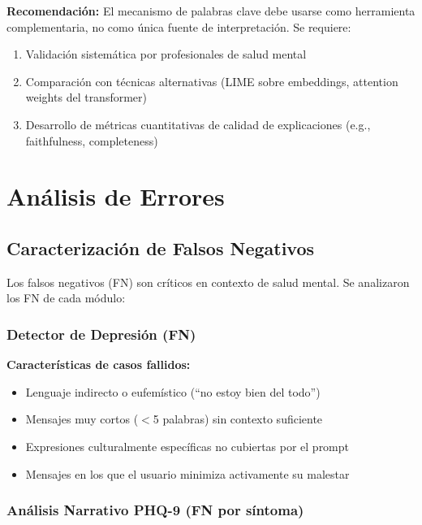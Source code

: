 \textbf{Recomendación:}
El mecanismo de palabras clave debe usarse como herramienta complementaria, no como
única fuente de interpretación. Se requiere:
\begin{enumerate}
    \item Validación sistemática por profesionales de salud mental
    \item Comparación con técnicas alternativas (LIME sobre embeddings, attention weights
          del transformer)
    \item Desarrollo de métricas cuantitativas de calidad de explicaciones
          (e.g., faithfulness, completeness)
\end{enumerate}

\section{Análisis de Errores}

\subsection{Caracterización de Falsos Negativos}

Los falsos negativos (FN) son críticos en contexto de salud mental. Se analizaron los FN
de cada módulo:

\subsubsection{Detector de Depresión (FN)}

\textbf{Características de casos fallidos:}
\begin{itemize}
    \item Lenguaje indirecto o eufemístico (``no estoy bien del todo'')
    \item Mensajes muy cortos ($<$5 palabras) sin contexto suficiente
    \item Expresiones culturalmente específicas no cubiertas por el prompt
    \item Mensajes en los que el usuario minimiza activamente su malestar
\end{itemize}

\subsubsection{Análisis Narrativo PHQ-9 (FN por síntoma)}

